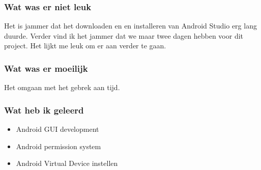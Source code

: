 \documentclass[../main.tex]{subfiles}
\begin{document}
\subsubsection{Wat was er niet leuk}
Het is jammer dat het downloaden en en installeren van Android Studio erg lang duurde.
Verder vind ik het jammer dat we maar twee dagen hebben voor dit project. Het lijkt me leuk
om er aan verder te gaan.
\subsubsection{Wat was er moeilijk}
Het omgaan met het gebrek aan tijd.
\subsubsection{Wat heb ik geleerd}
\begin{itemize}
	\item Android GUI development
	\item Android permission system
	\item Android Virtual Device instellen
\end{itemize}
\newpage
\end{document}
